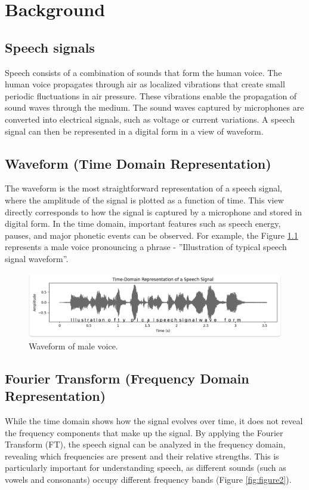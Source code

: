 \chapter{Background}
\onehalfspacing
\section{Speech signals}
Speech consists of a combination of sounds that form the human voice. The human voice propagates through air as localized vibrations that create small periodic fluctuations in air pressure. These vibrations enable the propagation of sound waves through the medium. The sound waves captured by microphones are converted into electrical signals, such as voltage or current variations. A speech signal can then be represented in a digital form in a view of waveform\cite{schroeder}.

\section{Waveform (Time Domain Representation)}
The waveform is the most straightforward representation of a speech signal, where the amplitude of the signal is plotted as a function of time. This view directly corresponds to how the signal is captured by a microphone and stored in digital form. In the time domain, important features such as speech energy, pauses, and major phonetic events can be observed. For example, the Figure \ref{fig:figure1} represents a male voice pronouncing a phrase - ”Illustration of typical speech signal waveform”.

\begin{figure}[htbp]
    \centering
    \includegraphics[width=.8\linewidth]{figures/figure7_waveform.jpg}
    \caption{Waveform of male voice.}
    \label{fig:figure1}
\end{figure}



\section{Fourier Transform (Frequency Domain Representation)}
While the time domain shows how the signal evolves over time, it does not reveal the frequency components that make up the signal.  
By applying the Fourier Transform (FT), the speech signal can be analyzed in the frequency domain, revealing which frequencies are present and their relative strengths.  
This is particularly important for understanding speech, as different sounds (such as vowels and consonants) occupy different frequency bands (Figure \ref{fig:figure2}). 


